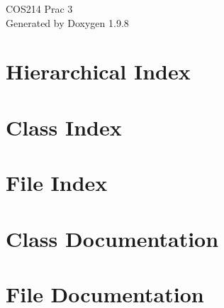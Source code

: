 \documentclass[twoside]{book}
\newcommand{\+}{\discretionary{\mbox{\scriptsize$\hookleftarrow$}}{}{}}
\newcommand{\clearemptydoublepage}{%
    \newpage{\pagestyle{empty}\cleardoublepage}%
  }
\begin{document}
  \raggedbottom
    \hypersetup{pageanchor=false,
                bookmarksnumbered=true,
                pdfencoding=unicode
               }
  \begin{titlepage}
  \vspace*{7cm}
  \begin{center}%
  {\Large COS214 Prac 3}\\
  \vspace*{1cm}
  {\large Generated by Doxygen 1.9.8}\\
  \end{center}
  \end{titlepage}
  \clearemptydoublepage
  \tableofcontents
  \clearemptydoublepage
  \hypersetup{pageanchor=true}
\chapter{Hierarchical Index}

\chapter{Class Index}

\chapter{File Index}

\chapter{Class Documentation}






















\chapter{File Documentation}























  \backmatter
  \newpage
  \clearemptydoublepage
  \printindex
\end{document}
